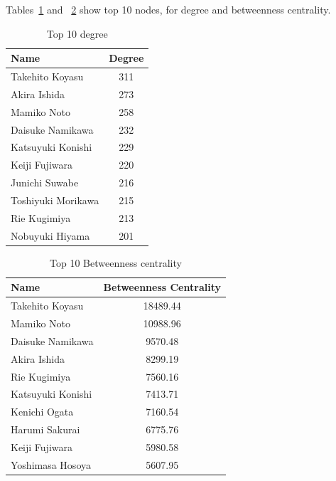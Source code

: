 Tables~\ref{tab:top10Degree} and ~\ref{tab:top10BtwC} show top 10 nodes, for degree and betweenness centrality. 
\begin{table}[!hbt]
	\begin{center}
	\caption{Top 10 degree}
	\label{tab:top10Degree}
	\begin{tabular}{|l|c|}
		\hline
		Name & Degree\\ 
		\hline
		Takehito Koyasu & 311 \\ 
		\hline
		Akira Ishida & 273\\ 
		\hline
		Mamiko Noto & 258\\ 
		\hline
		Daisuke Namikawa & 232 \\ 
		\hline
		Katsuyuki Konishi & 229 \\ 
		\hline
		Keiji Fujiwara & 220 \\ 
		\hline
		Junichi Suwabe & 216 \\ 
		\hline
		Toshiyuki Morikawa & 215 \\ 
		\hline
		Rie Kugimiya & 213 \\ 
		\hline
		Nobuyuki Hiyama & 201 \\ 
		\hline
	\end{tabular}
	\end{center}
\end{table}

\begin{table}[!hbt]
	\begin{center}
	\caption{Top 10 Betweenness centrality}
	\label{tab:top10BtwC}
	\begin{tabular}{|l|c|}
		\hline
		Name & Betweenness Centrality \\ 
		\hline
		Takehito Koyasu & 18489.44 \\ 
		\hline
		Mamiko Noto & 10988.96 \\ 
		\hline
		Daisuke Namikawa & 9570.48 \\ 
		\hline
		Akira Ishida & 8299.19 \\ 
		\hline
		Rie Kugimiya & 7560.16 \\ 
		\hline
		Katsuyuki Konishi & 7413.71 \\ 
		\hline
		Kenichi Ogata & 7160.54 \\ 
		\hline
		Harumi Sakurai & 6775.76 \\ 
		\hline
		Keiji Fujiwara & 5980.58 \\ 
		\hline
		Yoshimasa Hosoya & 5607.95 \\ 
		\hline
	\end{tabular}
	\end{center}
\end{table}

